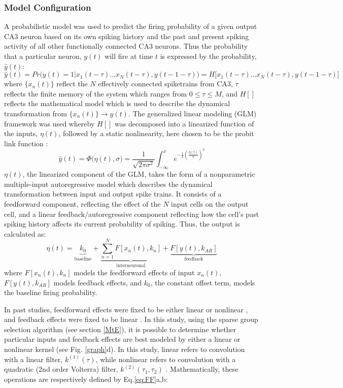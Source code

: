 \documentclass[11pt,a4paper,final]{article}
\begin{document}
\subsubsection{Model Configuration \label{MtC}}
A probabilistic model was used to predict the firing probability of a given output CA3 neuron based on its own spiking history and the past and present spiking activity of all other functionally connected CA3 neurons.
Thus the probability that a particular neuron, $y(t)$ will fire at time $t$ is expressed by the probability, $\hat{y}(t)$:
\begin{equation}
\hat{y}(t)=Pr\Big(y(t)=1|x_1(t-\tau)...x_{N}(t-\tau),y(t-1-\tau)\Big)=H\Big[x_1(t-\tau)...x_{N}(t-\tau),y(t-1-\tau)\Big]
\label{eq:prob}
\end{equation}
where $\{x_n(t)\}$ reflect the $N$ effectively connected spiketrains from CA3, $\tau$ reflects the finite memory of the system which ranges from $0 \leq \tau \leq M$, and $H[]$ reflects the mathematical model which is used to describe the dynamical transformation from $\{x_n(t)\}\to y(t)$.
The generalized linear modeling (GLM) framework was used whereby $H[]$ was decomposed into a linearized function of the inputs, $\eta(t)$, followed by a static nonlinearity, here chosen to be the probit link function \citep{truccolo05,song07}:
\begin{equation}
\hat{y}(t)=\Phi\Big(\eta(t),\sigma\Big)=\frac{1}{\sqrt{2\pi\sigma^2}}\int_{-\infty}^xe^{-\frac{1}{2}(\frac{\eta(t)}{\sigma})^2}
\label{eq:GLM}
\end{equation}
$\eta(t)$, the linearized component of the GLM, takes the form of a nonparametric multiple-input autoregressive model which describes the dynamical transformation between input and output spike trains.
It consists of a feedforward component, reflecting the effect of the $N$ input cells on the output cell, and a linear feedback/autoregressive component reflecting how the cell's past spiking history affects its current probability of spiking. Thus, the output is calculated as:
\begin{equation}
\eta(t)=\underbrace{k_0}_\text{baseline}+\underbrace{\sum_{n=1}^{N}F[x_n(t),k_n]}_\text{interneuronal}+
\underbrace{F[y(t),k_{AR}]}_\text{feedback}
\label{eq:MVAR}
\end{equation}
where $F[x_n(t),k_n]$ models the feedforward effects of input $x_n(t)$, $F[y(t),k_{AR}]$ models feedback effects, and $k_0$, the constant offset term, models the baseline firing probability.

In past studies, feedforward effects were fixed to be either linear \citep{sandler14} or nonlinear \citep{sandler15,song07}, and feedback effects were fixed to be linear \citep{song07}.
In this study, using the sparse group selection algorithm (see section \ref{MtE}), it is possible to determine whether particular inputs and feedback effects are best modeled by either a linear or nonlinear kernel (see Fig. \ref{graph}d).
In this study, linear refers to convolution with a linear filter, $k^{(1)}(\tau)$, while nonlinear refers to convolution with a quadratic (2nd order Volterra) filter, $k^{(2)}(\tau_1,\tau_2)$ \citep{marm04,rajan13}.
Mathematically, these operations are respectively defined by Eq.\ref{eq:FF}a,b:
\end{document}
